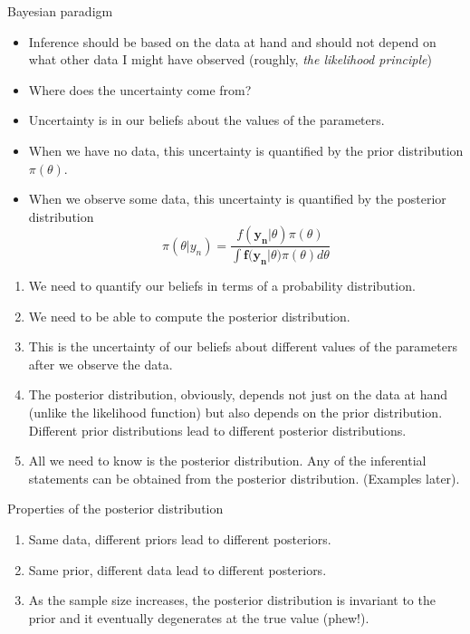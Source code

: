 \documentclass[10pt]{beamer}
\begin{document}
\begin{frame}
\begin{center}
\alert{\LARGE Bayesian paradigm}
\end{center}
\begin{itemize}
\item Inference should be based on the data at hand and should not depend on what other data I might have observed (roughly, \textit {the likelihood principle})
\pause
\item Where does the uncertainty come from? 
\pause
\item Uncertainty is in our beliefs about the values of the parameters. 
\pause
\item When we have no data, this uncertainty is quantified by the prior distribution $\pi(\theta)$.
\pause
\item When we observe some data, this uncertainty is quantified by the posterior distribution
\begin{equation}
\pi(\theta|y_{n})=\frac{f(\mathbf{y_{n}}|\theta)\pi(\theta)}{\int \mathbf{f(y_{n}}|\theta)\pi(\theta)d\theta}
\end{equation}
\end{itemize}
\end{frame}

\begin{frame}
\begin{enumerate}
\item We need to quantify our beliefs in terms of a probability distribution.
\pause
\item We need to be able to compute the posterior distribution.
\pause 
\item This is the uncertainty of our \alert {beliefs} about different values of the parameters after we observe the data. 
\pause
\item The posterior distribution, obviously, depends not just on the data at hand (unlike the likelihood function) but also depends on the prior distribution. Different prior distributions lead to different posterior distributions.
\pause
\item All we need to know is the posterior distribution. Any of the inferential statements can be obtained from the posterior distribution. (Examples later). 
\end{enumerate}
\end{frame}

\begin{frame}
\begin{center}
\LARGE Properties of the posterior distribution
\end{center}
\begin{enumerate}
\item Same data, different priors lead to different posteriors.
\pause
\item Same prior, different data lead to different posteriors. 
\pause
\item As the sample size increases, the posterior distribution is invariant to the prior and it eventually degenerates at the true value (phew!). 
\end{enumerate}
\end{frame}
\end{document}
